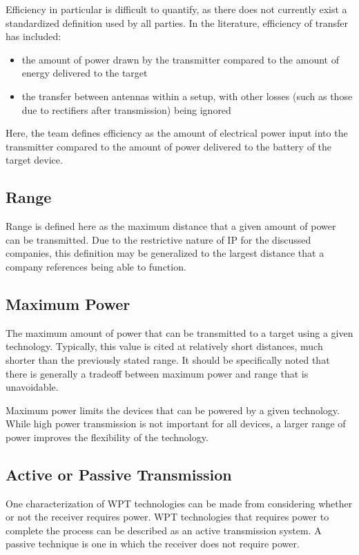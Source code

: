 Efficiency in particular is difficult to quantify, as there does not currently exist a standardized definition used by all parties. In the literature, efficiency of transfer has included:
\begin{itemize}
    \item the amount of power drawn by the transmitter compared to the amount of energy delivered to the target
    \item the transfer between antennas within a setup, with other losses (such as those due to rectifiers after transmission) being ignored
\end{itemize}

Here, the team defines efficiency as the amount of electrical power input into the transmitter compared to the amount of power delivered to the battery of the target device.

\subsection{Range}

Range is defined here as the maximum distance that a given amount of power can be transmitted. Due to the restrictive nature of IP for the discussed companies, this definition may be generalized to the largest distance that a company references being able to function.\\

\subsection{Maximum Power}

The maximum amount of power that can be transmitted to a target using a given technology. Typically, this value is cited at relatively short distances, much shorter than the previously stated range. It should be specifically noted that there is generally a tradeoff between maximum power and range that is unavoidable. 

Maximum power limits the devices that can be powered by a given technology. While high power transmission is not important for all devices, a larger range of power improves the flexibility of the technology.

\subsection{Active or Passive Transmission}

One characterization of WPT technologies can be made from considering whether or not the receiver requires power. WPT technologies that requires power to complete the process can be described as an active transmission system. A passive technique is one in which the receiver does not require power.

